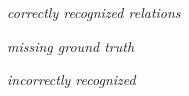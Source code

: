 \documentclass[10pt,twocolumn,letterpaper]{article}
\begin{document}
\begin{figure*}[t]
\centering
	\hspace{0.005\textwidth}
	\begin{minipage}[b]{0.60\textwidth}
    	\centering
    	\emph{correctly recognized relations}\\
    	\vspace{0.4ex}
	\end{minipage}
	\begin{minipage}[b]{0.19\textwidth}
    	\centering
    	\emph{missing ground truth}\\
    	\vspace{0.4ex}
	\end{minipage}
	\begin{minipage}[b]{0.19\textwidth}
    \centering
    \emph{incorrectly recognized}\\
    	\vspace{0.4ex}
	\end{minipage}
	

\end{figure*}
\end{document}
